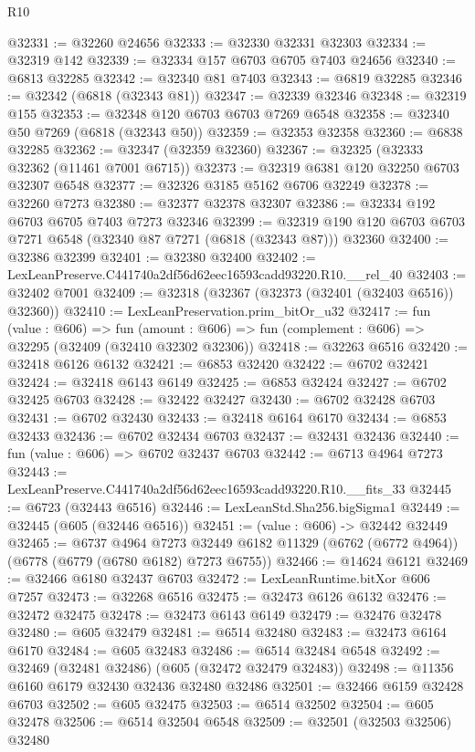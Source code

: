 \begin{lexlean}{R10}
\begin{coremodule}
@32331 := @32260 @24656
@32333 := @32330 @32331 @32303
@32334 := @32319 @142
@32339 := @32334 @157 @6703 @6705 @7403 @24656
@32340 := @6813 @32285
@32342 := @32340 @81 @7403
@32343 := @6819 @32285
@32346 := @32342 (@6818 (@32343 @81))
@32347 := @32339 @32346
@32348 := @32319 @155
@32353 := @32348 @120 @6703 @6703 @7269 @6548
@32358 := @32340 @50 @7269 (@6818 (@32343 @50))
@32359 := @32353 @32358
@32360 := @6838 @32285
@32362 := @32347 (@32359 @32360)
@32367 := @32325 (@32333 @32362 (@11461 @7001 @6715))
@32373 := @32319 @6381 @120 @32250 @6703 @32307 @6548
@32377 := @32326 @3185 @5162 @6706 @32249
@32378 := @32260 @7273
@32380 := @32377 @32378 @32307
@32386 := @32334 @192 @6703 @6705 @7403 @7273 @32346
@32399 := @32319 @190 @120 @6703 @6703 @7271 @6548 (@32340 @87 @7271 (@6818 (@32343 @87))) @32360
@32400 := @32386 @32399
@32401 := @32380 @32400
@32402 := LexLeanPreserve.C441740a2df56d62eec16593cadd93220.R10.__rel_40
@32403 := @32402 @7001
@32409 := @32318 (@32367 (@32373 (@32401 (@32403 @6516)) @32360))
@32410 := LexLeanPreservation.prim_bitOr_u32
@32417 := fun (value : @606) =>
  fun (amount : @606) => fun (complement : @606) => @32295 (@32409 (@32410 @32302 @32306))
@32418 := @32263 @6516
@32420 := @32418 @6126 @6132
@32421 := @6853 @32420
@32422 := @6702 @32421
@32424 := @32418 @6143 @6149
@32425 := @6853 @32424
@32427 := @6702 @32425 @6703
@32428 := @32422 @32427
@32430 := @6702 @32428 @6703
@32431 := @6702 @32430
@32433 := @32418 @6164 @6170
@32434 := @6853 @32433
@32436 := @6702 @32434 @6703
@32437 := @32431 @32436
@32440 := fun (value : @606) => @6702 @32437 @6703
@32442 := @6713 @4964 @7273
@32443 := LexLeanPreserve.C441740a2df56d62eec16593cadd93220.R10.__fits_33
@32445 := @6723 (@32443 @6516)
@32446 := LexLeanStd.Sha256.bigSigma1
@32449 := @32445 (@605 (@32446 @6516))
@32451 := (value : @606) -> @32442 @32449
@32465 := @6737
    @4964
    @7273
    @32449
    @6182
    @11329
    (@6762 (@6772 @4964))
    (@6778 (@6779 (@6780 @6182) @7273 @6755))
@32466 := @14624 @6121
@32469 := @32466 @6180 @32437 @6703
@32472 := LexLeanRuntime.bitXor @606 @7257
@32473 := @32268 @6516
@32475 := @32473 @6126 @6132
@32476 := @32472 @32475
@32478 := @32473 @6143 @6149
@32479 := @32476 @32478
@32480 := @605 @32479
@32481 := @6514 @32480
@32483 := @32473 @6164 @6170
@32484 := @605 @32483
@32486 := @6514 @32484 @6548
@32492 := @32469 (@32481 @32486) (@605 (@32472 @32479 @32483))
@32498 := @11356 @6160 @6179 @32430 @32436 @32480 @32486
@32501 := @32466 @6159 @32428 @6703
@32502 := @605 @32475
@32503 := @6514 @32502
@32504 := @605 @32478
@32506 := @6514 @32504 @6548
@32509 := @32501 (@32503 @32506) @32480

\end{coremodule}
\end{lexlean}
